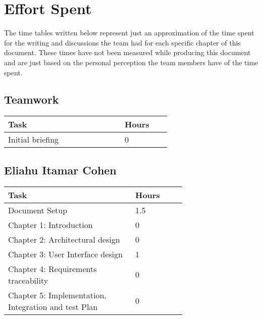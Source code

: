 \section{Effort Spent}
The time tables written below represent just an approximation of the time spent for the
writing and discussions the team had for each specific chapter of this document. These
times have not been measured while producing this document and are just based on the
personal perception the team members have of the time spent.
\subsection{Teamwork}
\begin{center}
    \begin{tabular}{@{}p{0.5\linewidth} p{0.2\linewidth}@{}}
        \hline
        \textbf{Task} & \textbf{Hours} \\ \hline
        Initial briefing & 0 \\ \hline
    \end{tabular}
\end{center}

\subsection{Eliahu Itamar Cohen}
\begin{center}
    \begin{tabular}{@{}p{0.5\linewidth} p{0.2\linewidth}@{}}
        \hline
        \textbf{Task} & \textbf{Hours} \\ \hline
        Document Setup & 1.5 \\ \hline
        Chapter 1: Introduction & 0 \\ \hline
        Chapter 2: Architectural design & 0 \\ \hline
        Chapter 3: User Interface design & 1 \\ \hline
        Chapter 4: Requirements traceability & 0 \\ \hline
        Chapter 5: Implementation, Integration
and test Plan & 0 \\ \hline
     
    \end{tabular}
\end{center}

